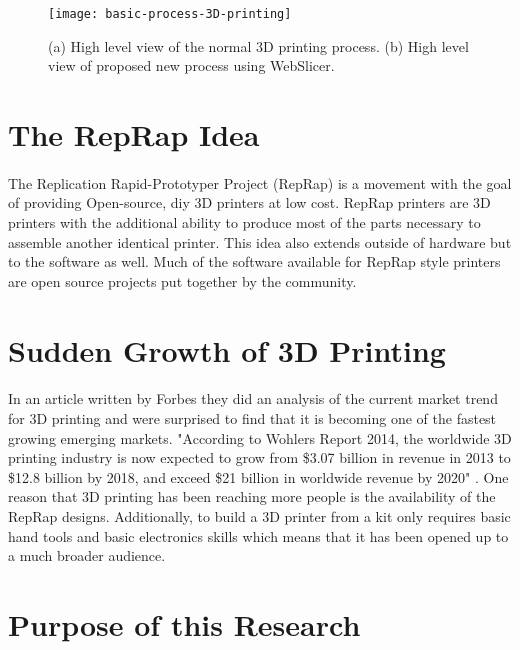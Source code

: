 \begin{figure}[!ht]
  \centering
  \texttt{[image: basic-process-3D-printing]}
  \caption{(a) High level view of the normal 3D printing process. (b) High level view of proposed new process using WebSlicer.}
\end{figure}


\section{The RepRap Idea}
\paragraph{}
The Replication Rapid-Prototyper Project (RepRap) is a movement with the goal of providing Open-source, diy 3D printers at low cost.
RepRap printers are 3D printers with the additional ability to produce most of the parts necessary to assemble another identical printer.
This idea also extends outside of hardware but to the software as well.
Much of the software available for RepRap style printers are open source projects put together by the community.

\section{Sudden Growth of 3D Printing}
\paragraph{}
In an article written by Forbes they did an analysis of the current market trend for 3D printing and were surprised to find that it is becoming one of the fastest growing emerging markets.
"According to Wohlers Report 2014, the worldwide 3D printing industry is now expected to grow from \$3.07 billion in revenue in 2013 to \$12.8 billion by 2018, and exceed \$21 billion in worldwide revenue by 2020" \citep{forbes3D}.
One reason that 3D printing has been reaching more people is the availability of the RepRap designs.
Additionally, to build a 3D printer from a kit only requires basic hand tools and basic electronics skills which means that it has been opened up to a much broader audience.

\section{Purpose of this Research}
